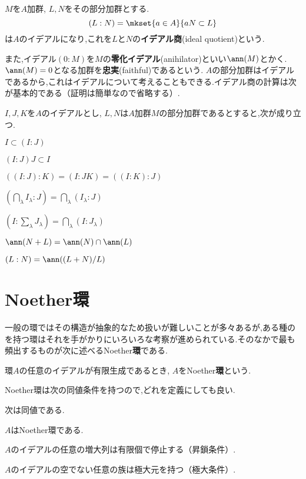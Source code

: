 \begin{defi}[イデアル商]
	$M$を$A$加群, $L,N$をその部分加群とする.
	\[(L:N)=\mkset{a\in A}{aN\subset L}\]
	は$A$のイデアルになり,これを$L$と$N$の\textbf{イデアル商}(ideal quotient)という.
\end{defi}

また,イデアル$(0:M)$を$M$の\textbf{零化イデアル}(anihilator)といい$\ann(M)$とかく. $\ann(M)=0$となる加群を\textbf{忠実}(faithful)であるという. $A$の部分加群はイデアルであるから,これはイデアルについて考えることもできる.イデアル商の計算は次が基本的である（証明は簡単なので省略する）.

\begin{prop}\label{prop:加群商}
	$I,J,K$を$A$のイデアルとし, $L,N$は$A$加群$M$の部分加群であるとすると,次が成り立つ.
	\begin{sakura}
		\item $I\subset(I:J)$
		\item $(I:J)J\subset I$
		\item $((I:J):K)=(I:JK)=((I:K):J)$
		\item $(\bigcap_\lambda I_\lambda:J)=\bigcap_\lambda (I_\lambda:J)$
		\item $(I:\sum_\lambda J_\lambda)=\bigcap_\lambda (I:J_\lambda)$
		\item $\ann (N+L)=\ann (N)\cap\ann (L)$
		\item $(L:N)=\ann((L+N)/L)$
	\end{sakura}
\end{prop}

\section{Noether環}

一般の環ではその構造が抽象的なため扱いが難しいことが多々あるが,ある種のを持つ環はそれを手がかりにいろいろな考察が進められている.そのなかで最も頻出するものが次に述べるNoether\textbf{環}である.

\begin{defi}[Noether環]\label{defi:Noether環}
		環$A$の任意のイデアルが有限生成であるとき, $A$をNoether\textbf{環}という.
\end{defi}
	
Noether環は次の同値条件を持つので,どれを定義にしても良い.

\begin{prop}
	次は同値である.
	\begin{sakura}
		\item $A$はNoether環である.
		\item $A$のイデアルの任意の増大列は有限個で停止する（昇鎖条件）.
		\item $A$のイデアルの空でない任意の族は極大元を持つ（極大条件）.
	\end{sakura}
\end{prop}
	
